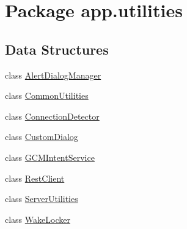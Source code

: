 \hypertarget{namespaceapp_1_1utilities}{\section{Package app.\-utilities}
\label{namespaceapp_1_1utilities}
}
\subsection*{Data Structures}
\begin{DoxyCompactItemize}
\item 
class \hyperlink{classapp_1_1utilities_1_1_alert_dialog_manager}{Alert\-Dialog\-Manager}
\item 
class \hyperlink{classapp_1_1utilities_1_1_common_utilities}{Common\-Utilities}
\item 
class \hyperlink{classapp_1_1utilities_1_1_connection_detector}{Connection\-Detector}
\item 
class \hyperlink{classapp_1_1utilities_1_1_custom_dialog}{Custom\-Dialog}
\item 
class \hyperlink{classapp_1_1utilities_1_1_g_c_m_intent_service}{G\-C\-M\-Intent\-Service}
\item 
class \hyperlink{classapp_1_1utilities_1_1_rest_client}{Rest\-Client}
\item 
class \hyperlink{classapp_1_1utilities_1_1_server_utilities}{Server\-Utilities}
\item 
class \hyperlink{classapp_1_1utilities_1_1_wake_locker}{Wake\-Locker}
\end{DoxyCompactItemize}
